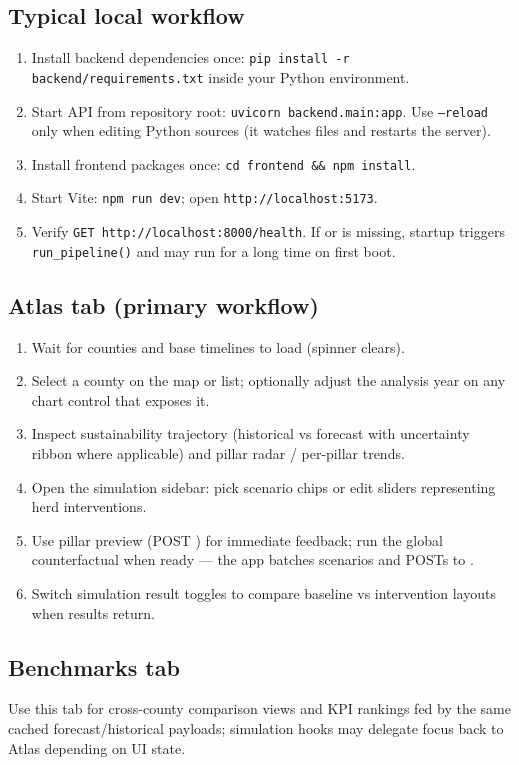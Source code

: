 \documentclass[11pt,a4paper]{article}
\begin{document}
\subsection{Typical local workflow}
\begin{enumerate}
  \item Install backend dependencies once: \texttt{pip install -r backend/requirements.txt} inside your Python environment.
  \item Start API from repository root: \texttt{uvicorn backend.main:app}. Use \texttt{--reload} only when editing Python sources (it watches files and restarts the server).
  \item Install frontend packages once: \texttt{cd frontend \&\& npm install}.
  \item Start Vite: \texttt{npm run dev}; open \texttt{http://localhost:5173}.
  \item Verify \texttt{GET http://localhost:8000/health}. If  or  is missing, startup triggers \texttt{run\_pipeline()} and may run for a long time on first boot.
\end{enumerate}

\subsection{Atlas tab (primary workflow)}
\begin{enumerate}
  \item Wait for counties and base timelines to load (spinner clears).
  \item Select a county on the map or list; optionally adjust the analysis year on any chart control that exposes it.
  \item Inspect sustainability trajectory (historical vs forecast with uncertainty ribbon where applicable) and pillar radar / per-pillar trends.
  \item Open the simulation sidebar: pick scenario chips or edit sliders representing herd interventions.
  \item Use pillar preview (POST ) for immediate feedback; run the global counterfactual when ready --- the app batches scenarios and POSTs to .
  \item Switch simulation result toggles to compare baseline vs intervention layouts when results return.
\end{enumerate}

\subsection{Benchmarks tab}
Use this tab for cross-county comparison views and KPI rankings fed by the same cached forecast/historical payloads; simulation hooks may delegate focus back to Atlas depending on UI state.
\end{document}
